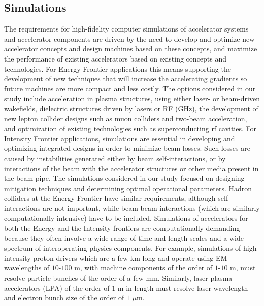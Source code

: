\subsection{Simulations} \label{subsec:accel-simu}
The requirements for high-fidelity computer simulations of accelerator systems and accelerator components are driven by the need to develop and optimize new accelerator concepts and design machines based on these concepts, and maximize the performance of existing accelerators based on existing concepts and technologies.  For  Energy Frontier applications this means supporting the development of new techniques that will increase the accelerating gradients so future machines are more compact and less costly. The options considered in our study include acceleration in plasma structures, using either laser- or beam-driven wakefields, dielectric structures driven by lasers or RF (GHz), the development of new lepton collider designs such as muon colliders and two-beam acceleration, and optimization of existing technologies such as superconducting rf cavities. For  Intensity Frontier applications, simulations are essential in developing and optimizing integrated designs in order to minimize beam losses.  Such losses are caused by instabilities generated either by beam self-interactions, or by interactions of the beam with the accelerator structures or other media present in the beam pipe.  The simulations considered in our study focused on designing mitigation techniques and determining optimal operational parameters.  Hadron colliders at the Energy Frontier have similar requirements, although self-interactions are not important, while beam-beam interactions (which are similarly computationally intensive) have to be included.  
Simulations of accelerators for both the Energy and the Intensity frontiers are computationally demanding because they often involve a wide range of time and length scales and a wide spectrum of interoperating physics components. For example, simulations of high-intensity proton drivers which are a few km long and operate using EM wavelengths of $10$-$100$ m,  with machine components of the order of $1$-$10$ m, must resolve particle bunches of the order of a few mm. Similarly, laser-plasma accelerators (LPA) of the order of $1$ m in length must resolve laser wavelength and electron bunch size of the order of $1$ $\mu$m.


